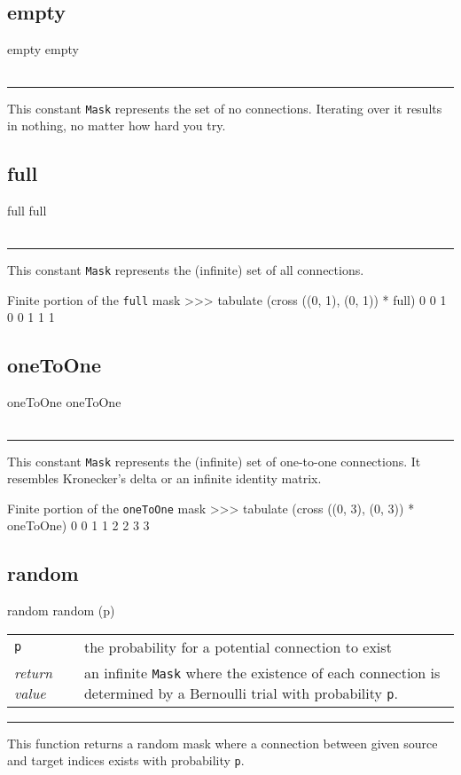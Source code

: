 \documentclass[a4paper,twoside]{report}
\makeatletter
\newenvironment{parameters}%
{\begin{tabular}{@{\hspace{2em}}lp{0.6\textwidth}}}%
{\end{tabular}\par\vspace{1mm}\par\hrule\par\vspace{5mm}}
\newcommand{\cls}[1]{\lstinline|#1|}
\newcommand{\fa}[1]{\lstinline|#1|}
\newcommand{\expr}[1]{\lstinline|#1|}
\newcommand{\ret}{\emph{return value}}
\makeatother
\begin{document}
\subsection{empty}

\begin{head}{empty}
  empty
\end{head}
\begin{parameters}
\end{parameters}
This constant \cls{Mask} represents the set of no connections.
Iterating over it results in nothing, no matter how hard you try.

\subsection{full}

\begin{head}{full}
  full
\end{head}
\begin{parameters}
\end{parameters}
This constant \cls{Mask} represents the (infinite) set of all
connections.

\begin{code}{Finite portion of the \expr{full} mask}
>>> tabulate (cross ((0, 1), (0, 1)) * full)
0 	0
1 	0
0 	1
1 	1
\end{code}

\subsection{oneToOne}
\begin{head}{oneToOne}
  oneToOne
\end{head}
\begin{parameters}
\end{parameters}
This constant \cls{Mask} represents the (infinite) set of one-to-one
connections.  It resembles Kronecker's delta or an infinite identity
matrix.

\begin{code}{Finite portion of the \expr{oneToOne} mask}
>>> tabulate (cross ((0, 3), (0, 3)) * oneToOne)
0 	0
1 	1
2 	2
3 	3
\end{code}

\subsection{random}
\begin{head}{random}
  random (p)
\end{head}
\begin{parameters}
  \lstinline|p| &%
  the probability for a potential connection to exist\\
  \ret &%
  an infinite \cls{Mask} where the existence of each connection is
  determined by a Bernoulli trial with probability \fa{p}.\\
\end{parameters}
This function returns a random mask where a connection between given
source and target indices exists with probability \fa{p}.
\end{document}
